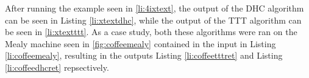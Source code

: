 After running the example seen in \ref{li:4ixtext}, the output of the DHC algorithm can be seen in Listing \ref{li:xtextdhc}, while the output of the TTT algorithm can be seen in \ref{li:xtextttt}. As a case study, both these algorithms were ran on the Mealy machine seen in \ref{fig:coffeemealy} contained in the input in Listing \ref{li:coffeemealy}, resulting in the outputs Listing \ref{li:coffeetttret} and Listing \ref{li:coffeedhcret} repsectively.
